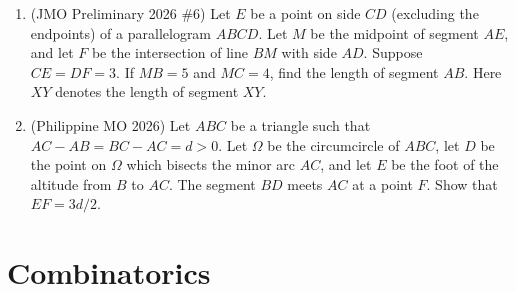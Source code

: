\documentclass[11pt,letterpaper]{article}
\begin{document}
\begin{enumerate}[resume]
    \item (JMO Preliminary 2026 \#6) Let $E$ be a point on side $CD$ (excluding the endpoints) of a parallelogram $ABCD$. Let $M$ be the midpoint of segment $AE$, and let $F$ be the intersection of line $BM$ with side $AD$. Suppose $CE=DF=3$. If $MB=5$ and $MC=4$, find the length of segment $AB$. Here $XY$ denotes the length of segment $XY$.

    \item (Philippine MO 2026) Let $ABC$ be a triangle such that $AC-AB=BC-AC=d>0$. Let $\Omega$ be the circumcircle of $ABC$, let $D$ be the point on $\Omega$ which bisects the minor arc $AC$, and let $E$ be the foot of the altitude from $B$ to $AC$. The segment $BD$ meets $AC$ at a point $F$. Show that $EF=3d/2$.
\end{enumerate}

\section*{Combinatorics}
\end{document}
